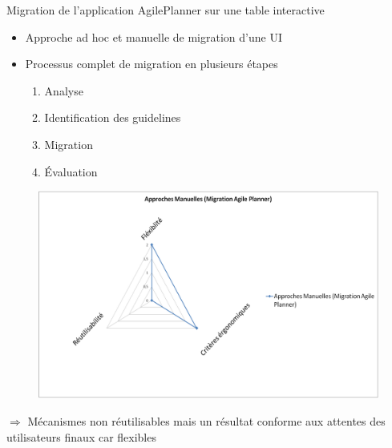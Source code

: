 \documentclass[11pt]{beamer}
\begin{document}
\begin{frame}[t]{Migration de l'application AgilePlanner sur une table interactive{\tiny ~\cite{Wang2008}}}
\begin{itemize}
	\item {\scriptsize Approche ad hoc et manuelle de migration d'une UI}
	\item {\scriptsize Processus complet de migration en plusieurs étapes }
		\begin{enumerate}
			\item {\tiny Analyse}
			\item {\tiny Identification des guidelines}
			\item {\tiny Migration}
			\item {\tiny Évaluation}
		\end{enumerate}
\end{itemize}

\begin{figure}
\centering
\includegraphics[scale=.26]{./img/synthese1}
\end{figure}

{\scriptsize $\Rightarrow$ Mécanismes non réutilisables mais un résultat conforme aux attentes des utilisateurs finaux car flexibles}
\end{frame}
\end{document}
